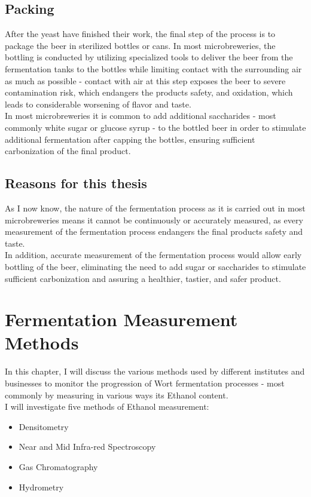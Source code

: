 \documentclass[twoside]{ctuthesis}
\theoremstyle{plain}
\theoremstyle{definition}
\theoremstyle{note}
\begin{document}
\section{Packing}
After the yeast have finished their work, the final step of the process is to package the beer in sterilized bottles or cans. In most microbreweries, the bottling is conducted by utilizing specialized tools to deliver the beer from the fermentation tanks to the bottles while limiting contact with the surrounding air as much as possible - contact with air at this step exposes the beer to severe contamination risk,  which endangers the products safety, and oxidation, which leads to considerable worsening of flavor and taste.\\
In most microbreweries it is common to add additional saccharides - most commonly white sugar or glucose syrup - to the bottled beer in order to stimulate additional fermentation after capping the bottles, ensuring sufficient carbonization of the final product.

\section{Reasons for this thesis}
As I now know, the nature of the fermentation process as it is carried out in most microbreweries means it cannot be continuously or accurately measured, as every measurement of the fermentation process endangers the final products safety and taste.\\
In addition, accurate measurement of the fermentation process would allow early bottling of the beer, eliminating the need to add sugar or saccharides to stimulate sufficient carbonization and assuring a healthier, tastier, and safer product.

\chapter{Fermentation Measurement Methods}
In this chapter, I will discuss the various methods used by different institutes and businesses to monitor the progression of Wort fermentation processes - most commonly by measuring in various ways its Ethanol content.\\
I will investigate five methods of Ethanol measurement:

\begin{itemize}
	\item Densitometry
	\item Near and Mid Infra-red Spectroscopy
	\item Gas Chromatography
	\item Hydrometry
\end{itemize}
\end{document}
